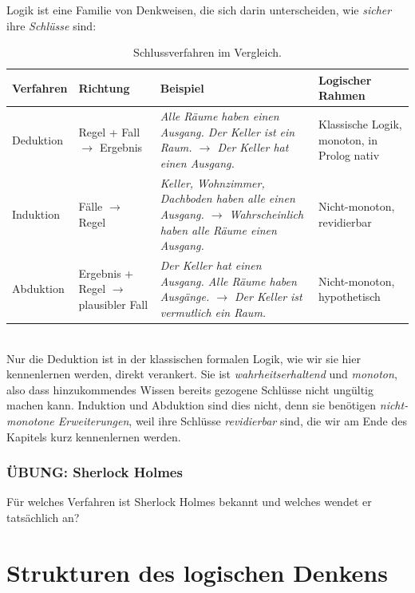 \documentclass[parskip=half,a4paper,11pt]{scrreprt}
\begin{document}
Logik ist eine Familie von Denkweisen, die sich darin unterscheiden, wie \textit{sicher} ihre \textit{Schlüsse} sind:\\
\begin{table}[h]
\centering
\begin{tabular}{>{\raggedright\arraybackslash}p{2.2cm} >{\raggedright\arraybackslash}p{3.5cm} >{\raggedright\arraybackslash}p{4.5cm} >{\raggedright\arraybackslash}p{4cm}}
\toprule
\textbf{Verfahren} & \textbf{Richtung} & \textbf{Beispiel} & \textbf{Logischer Rahmen} \\
\midrule
Deduktion &
  Regel + Fall $\rightarrow$ Ergebnis &
  \textit{Alle Räume haben einen Ausgang. Der Keller ist ein Raum.
  $\rightarrow$ Der Keller hat einen Ausgang.} &
  Klassische Logik, monoton, in Prolog nativ \\
\addlinespace
Induktion &
  Fälle $\rightarrow$ Regel &
  \textit{Keller, Wohnzimmer, Dachboden haben alle einen Ausgang.
  $\rightarrow$ Wahrscheinlich haben alle Räume einen Ausgang.} &
  Nicht-monoton, revidierbar \\
\addlinespace
Abduktion &
  Ergebnis + Regel $\rightarrow$ plausibler Fall &
  \textit{Der Keller hat einen Ausgang. Alle Räume haben Ausgänge.
  $\rightarrow$ Der Keller ist vermutlich ein Raum.} &
  Nicht-monoton, hypothetisch \\
\bottomrule
\end{tabular}
\caption{Schlussverfahren im Vergleich.}
\end{table}
\\
Nur die Deduktion ist in der klassischen formalen Logik, wie wir sie hier kennenlernen werden, direkt verankert. Sie ist \textit{wahrheitserhaltend} und \textit{monoton}, also dass hinzukommendes Wissen bereits gezogene Schlüsse nicht ungültig machen kann. Induktion und Abduktion sind dies nicht, denn sie benötigen \textit{nicht-monotone Erweiterungen}, weil ihre Schlüsse \textit{revidierbar} sind, die wir am Ende des Kapitels kurz kennenlernen werden. 

\subsubsection{ÜBUNG: Sherlock Holmes }

Für welches Verfahren ist Sherlock Holmes bekannt und welches wendet er tatsächlich an?

\section{Strukturen des logischen Denkens} 
\end{document}
